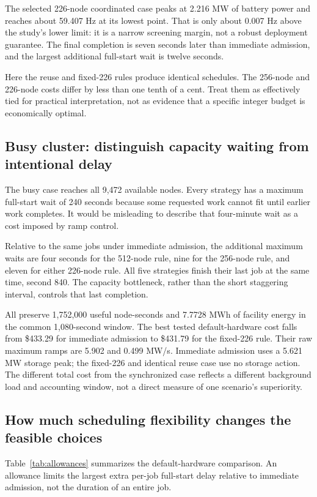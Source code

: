 \documentclass[11pt]{article}
\begin{document}
The selected 226-node coordinated case peaks at 2.216 MW of battery
power and reaches about 59.407 Hz at its lowest point. That is only
about 0.007 Hz above the study's lower limit: it is a narrow screening
margin, not a robust deployment guarantee. The final completion is
seven seconds later than immediate admission, and the largest
additional full-start wait is twelve seconds.

Here the reuse and fixed-226 rules produce identical schedules.
The 256-node and 226-node costs differ by less than one tenth of a
cent. Treat them as effectively tied for practical interpretation,
not as evidence that a specific integer budget is economically optimal.

\subsection{Busy cluster: distinguish capacity waiting from intentional delay}

The busy case reaches all 9,472 available nodes. Every strategy has a
maximum full-start wait of 240 seconds because some requested work
cannot fit until earlier work completes. It would be misleading to
describe that four-minute wait as a cost imposed by ramp control.

Relative to the same jobs under immediate admission, the additional
maximum waits are four seconds for the 512-node rule, nine for the
256-node rule, and eleven for either 226-node rule. All five strategies
finish their last job at the same time, second 840. The capacity
bottleneck, rather than the short staggering interval, controls that
last completion.

All preserve 1,752,000 useful node-seconds and 7.7728 MWh of facility
energy in the common 1,080-second window. The best tested default-hardware
cost falls from \$433.29 for immediate admission to \$431.79 for the
fixed-226 rule. Their raw maximum ramps are 5.902 and 0.499 MW/s.
Immediate admission uses a 5.621 MW storage peak; the fixed-226 and
identical reuse case use no storage action. The different total cost
from the synchronized case reflects a different background load and
accounting window, not a direct measure of one scenario's superiority.

\subsection{How much scheduling flexibility changes the feasible choices}

Table~\ref{tab:allowances} summarizes the default-hardware comparison.
An allowance limits the largest extra per-job full-start delay relative
to immediate admission, not the duration of an entire job.
\end{document}

